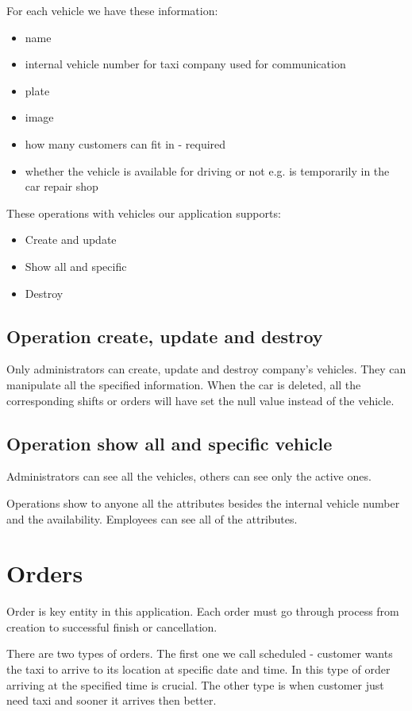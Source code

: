 		 For each vehicle we have these information:
		\begin{itemize}
			\item name
			\item internal vehicle number for taxi company used for communication
			\item plate
			\item image
			\item how many customers can fit in - required
			\item whether the vehicle is available for driving or not e.g. is temporarily in the car repair shop
		\end{itemize}
		These operations with vehicles our application supports:
		\begin{itemize}
			\item Create and update
			\item Show all and specific
			\item Destroy
		\end{itemize}
		\subsection{Operation create, update and destroy}
			Only administrators can create, update and destroy company's vehicles. They can manipulate all the specified information. When the car is deleted, all the corresponding shifts or orders will have set the null value instead of the vehicle.
		\subsection{Operation show all and specific vehicle}
			Administrators can see all the vehicles, others can see only the active ones. 
			
			Operations show to anyone all the attributes besides the internal vehicle number and the availability. Employees can see all of the attributes.
	\section{Orders}
	 	Order is key entity in this application. Each order must go through process from creation to successful finish or cancellation. 
	 	
	 	There are two types of orders. The first one we call scheduled - customer wants the taxi to arrive to its location at specific date and time. In this type of order arriving at the specified time is crucial. The other type is when customer just need taxi and sooner it arrives then better.
	 	
